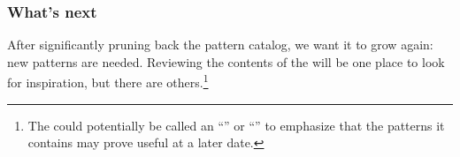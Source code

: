 \subsubsection*{What's next} After significantly pruning back the pattern catalog, we want it to grow again: new patterns are needed.  Reviewing the contents of the  will be one place to look for inspiration, but there are others.\footnote{The  could potentially be called an ``'' or ``'' to emphasize that the patterns it contains may prove useful at a later date.}
